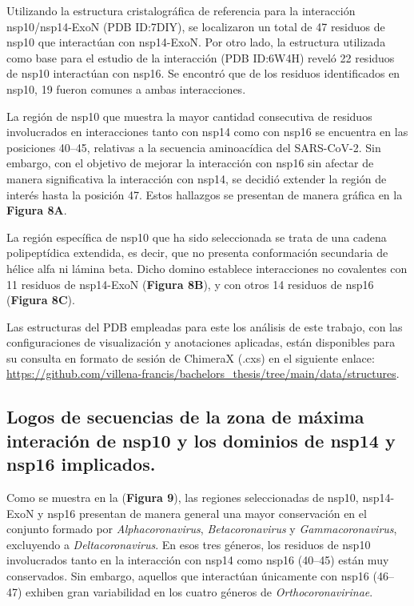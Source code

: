 Utilizando la estructura cristalográfica de referencia para la interacción 
nsp10/nsp14-ExoN (PDB ID:\@ 7DIY), se localizaron un total de 47 residuos de 
nsp10 que interactúan con nsp14-ExoN. Por otro lado, la estructura utilizada
como base para el estudio de la interacción (PDB ID:\@ 6W4H) reveló 22 
residuos de nsp10 interactúan con nsp16. Se encontró que de los residuos 
identificados en nsp10, 19 fueron comunes a ambas interacciones.

La región de nsp10 que muestra la mayor cantidad consecutiva de residuos
involucrados en interacciones tanto con nsp14 como con nsp16 se encuentra en
las posiciones 40--45, relativas a la secuencia aminoacídica del SARS-CoV-2. 
Sin embargo, con el objetivo de mejorar la interacción con nsp16 sin afectar
de manera significativa la interacción con nsp14, se decidió extender la 
región de interés hasta la posición 47. Estos hallazgos se presentan de 
manera gráfica en la \textbf{Figura 8A}.

La región específica de nsp10 que ha sido seleccionada se trata de una 
cadena polipeptídica extendida, es decir, que no presenta conformación 
secundaria de hélice alfa ni lámina beta. Dicho domino establece 
interacciones no covalentes con 11 residuos de nsp14-ExoN 
(\textbf{Figura 8B}), y con otros 14 residuos de nsp16 (\textbf{Figura 8C}).

Las estructuras del PDB empleadas para este los análisis de este trabajo, 
con las configuraciones de visualización y anotaciones aplicadas, están 
disponibles para su consulta en formato de sesión de ChimeraX (.cxs) en el 
siguiente enlace: \url{https://github.com/villena-francis/bachelors_thesis/tree/main/data/structures}.

\subsection{Logos de secuencias de la zona de máxima interación de nsp10 y los
dominios de nsp14 y nsp16 implicados.}

Como se muestra en la (\textbf{Figura 9}), las regiones seleccionadas de 
nsp10, nsp14-ExoN y nsp16 presentan de manera general una mayor conservación 
en el conjunto formado por \textit{Alphacoronavirus}, 
\textit{Betacoronavirus} y \textit{Gammacoronavirus}, excluyendo a 
\textit{Deltacoronavirus}. En esos tres géneros, los residuos de nsp10 
involucrados tanto en la interacción con nsp14 como nsp16 (40--45) están muy 
conservados. Sin embargo, aquellos que interactúan únicamente con nsp16 
(46--47) exhiben gran variabilidad en los cuatro géneros de 
\textit{Orthocoronavirinae}.

